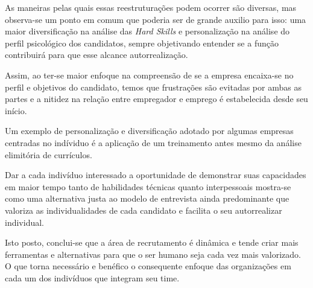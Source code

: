 \documentclass[12pt]{article}
\begin{document}
As maneiras pelas quais essas reestruturações podem ocorrer são diversas, mas observa-se um ponto em comum que poderia ser de grande auxilio para isso: uma maior diversificação na análise das \emph{Hard Skills} e personalização na análise do perfil psicológico dos candidatos, sempre objetivando entender se a função contribuirá para que esse alcance autorrealização.

Assim, ao ter-se maior enfoque na compreensão de se a empresa encaixa-se no perfil e objetivos do candidato, temos que frustrações são evitadas por ambas as partes e a nitidez na relação entre empregador e emprego é estabelecida desde seu início. 

Um exemplo de personalização e diversificação adotado por algumas empresas centradas no indíviduo é a aplicação de um treinamento antes mesmo da análise elimitória de currículos. 

Dar a cada indivíduo interessado a oportunidade de demonstrar suas capacidades em maior tempo tanto de habilidades técnicas quanto interpessoais mostra-se como uma alternativa justa ao modelo de entrevista ainda predominante que valoriza as individualidades de cada candidato e facilita o seu autorrealizar individual. 

Isto posto, conclui-se que a área de recrutamento é dinâmica e tende criar mais ferramentas e alternativas para que o ser humano seja cada vez mais valorizado. O que torna necessário e benéfico o consequente enfoque das organizações em cada um dos indivíduos que integram seu time. 
\newpage

\end{document}
